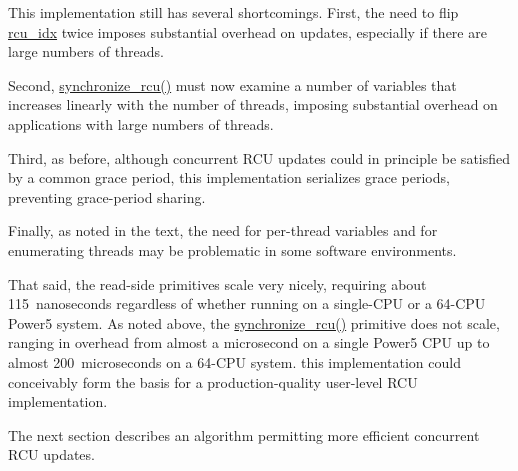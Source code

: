  \QuickQuizEnd

This implementation still has several shortcomings.
First, the need to flip \url{rcu_idx} twice imposes substantial overhead
on updates, especially if there are large numbers of threads.

Second, \url{synchronize_rcu()} must now examine a number of variables
that increases linearly with the number of threads, imposing substantial
overhead on applications with large numbers of threads.

Third, as before, although concurrent RCU updates could in principle
be satisfied by a common grace period, this implementation serializes
grace periods, preventing grace-period sharing.

Finally, as noted in the text, the need for per-thread variables
and for enumerating threads may be problematic in some software
environments.

That said, the read-side primitives scale very nicely, requiring about
115~nanoseconds regardless of whether running on a single-CPU or a 64-CPU
Power5 system.
As noted above, the \url{synchronize_rcu()} primitive does not scale,
ranging in overhead from almost a microsecond on a single Power5 CPU
up to almost 200~microseconds on a 64-CPU system.
this implementation could conceivably form the basis for a
production-quality user-level RCU implementation.

The next section describes an algorithm permitting more efficient
concurrent RCU updates.


